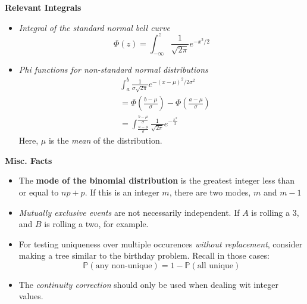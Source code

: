 \documentclass[titlepage, 12pt, leqno]{article}
\begin{document}
\begin{multicols}{2}
\columnbreak
\textbf{Relevant Integrals}
\begin{itemize}
    \item \textit{Integral of the standard normal bell curve}
        \[
            \Phi(z) = \int_{-\infty}^{z}\frac{1}{\sqrt{2\pi }}e^{-x^2/2}
        \]
    \item \textit{Phi functions for non-standard normal distributions}
       \begin{align*}
            &\int_{a}^{b}\frac{1}{\sigma\sqrt{2\pi }}e^{-(x-\mu)^2/2\sigma^2}\\
            &=\Phi\left(\frac{b-\mu}{\sigma}\right) -
            \Phi\left(\frac{a-\mu}{\sigma}\right) \\
            &= \int_{\frac{a-\mu}{\sigma}}^{\frac{b-\mu}{\sigma}}
            \frac{1}{\sqrt{2\pi}}e^{-\frac{x^2}{2}}
       \end{align*}
       Here, $\mu$ is the \textit{mean} of the distribution.
\end{itemize}

\textbf{Misc. Facts}
\begin{itemize}
    \item The \textbf{mode of the binomial distribution} is the greatest integer
        less than or equal to $np+p$. If this is an integer $m$, there are two
        modes, $m$ and $m-1$
    \item \textit{Mutually exclusive events} are not necessarily independent. If
        $A$ is rolling a 3, and $B$ is rolling a two, for example.
    \item For testing uniqueness over multiple occurences \textit{without
        replacement}, consider making a tree similar to the birthday problem.
        Recall in those cases:
        \[
            \mathbb{P}( \text{any non-unique}) = 1 - \mathbb{P}( \text{all 
            unique})
        \]
    \item The \textit{continuity correction} should only be used when dealing wit
        integer values.
\end{itemize}
\end{multicols}
\end{document}
